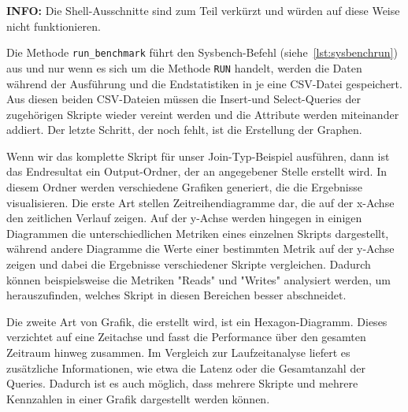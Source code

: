 \vspace{-5pt}

\vspace{-5pt}

\textbf{INFO:} Die Shell-Ausschnitte sind zum Teil verkürzt und würden auf diese Weise nicht funktionieren.

Die Methode \texttt{run\_benchmark} führt den Sysbench-Befehl (siehe~\ref{lst:sysbenchrun}) aus und nur wenn es sich um die Methode \texttt{RUN} handelt, werden die Daten während der Ausführung und die Endstatistiken in je eine CSV-Datei gespeichert.
Aus diesen beiden CSV-Dateien müssen die Insert-und Select-Queries der zugehörigen Skripte wieder vereint werden und die Attribute werden miteinander addiert.
Der letzte Schritt, der noch fehlt, ist die Erstellung der Graphen.

Wenn wir das komplette Skript für unser Join-Typ-Beispiel ausführen, dann ist das Endresultat ein Output-Ordner, der an angegebener Stelle erstellt wird.
In diesem Ordner werden verschiedene Grafiken generiert, die die Ergebnisse visualisieren.
Die erste Art stellen Zeitreihendiagramme dar, die auf der x-Achse den zeitlichen Verlauf zeigen.
Auf der y-Achse werden hingegen in einigen Diagrammen die unterschiedlichen Metriken eines einzelnen Skripts dargestellt, während andere Diagramme die Werte einer bestimmten Metrik auf der y-Achse zeigen und dabei die Ergebnisse verschiedener Skripte vergleichen.
Dadurch können beispielsweise die Metriken "Reads" und "Writes" analysiert werden, um herauszufinden, welches Skript in diesen Bereichen besser abschneidet.

Die zweite Art von Grafik, die erstellt wird, ist ein Hexagon-Diagramm.
Dieses verzichtet auf eine Zeitachse und fasst die Performance über den gesamten Zeitraum hinweg zusammen.
Im Vergleich zur Laufzeitanalyse liefert es zusätzliche Informationen, wie etwa die Latenz oder die Gesamtanzahl der Queries.
Dadurch ist es auch möglich, dass mehrere Skripte und mehrere Kennzahlen in einer Grafik dargestellt werden können.

